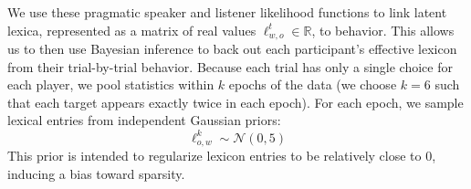 We use these pragmatic speaker and listener likelihood functions to link latent lexica, represented as a matrix of real values $\ell_{w,o}^t \in \mathbb{R}$, to behavior.
%
This allows us to then use Bayesian inference to back out each participant's effective lexicon from their trial-by-trial behavior.
Because each trial has only a single choice for each player, we pool statistics within $k$ epochs of the data (we choose $k=6$ such that each target appears exactly twice in each epoch). 
For each epoch, we sample lexical entries from independent Gaussian priors: $$\ell_{o,w}^k\sim\mathcal{N}(0, 5)$$ This prior is intended to regularize lexicon entries to be relatively close to 0, inducing a bias toward sparsity. %

